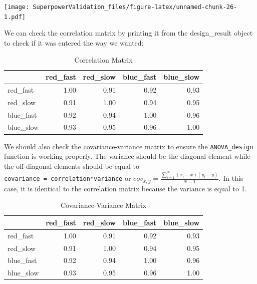 \documentclass[
]{book}
\newenvironment{Shaded}{\begin{snugshade}}{\end{snugshade}}
\newcommand{\NormalTok}[1]{#1}
\newcommand{\SpecialCharTok}[1]{\textcolor[rgb]{0.00,0.00,0.00}{#1}}
\begin{document}
\texttt{[image: SuperpowerValidation\_files/figure-latex/unnamed-chunk-26-1.pdf]}

\newpage

We can check the correlation matrix by printing it from the design\_result object to check if it was entered the way we wanted:

\begin{Shaded}
\end{Shaded}

\begin{table}[!h]

\caption{\label{tab:unnamed-chunk-28}Correlation Matrix}
\centering
\begin{tabular}[t]{l|r|r|r|r}
\hline
  & red\_fast & red\_slow & blue\_fast & blue\_slow\\
\hline
red\_fast & 1.00 & 0.91 & 0.92 & 0.93\\
\hline
red\_slow & 0.91 & 1.00 & 0.94 & 0.95\\
\hline
blue\_fast & 0.92 & 0.94 & 1.00 & 0.96\\
\hline
blue\_slow & 0.93 & 0.95 & 0.96 & 1.00\\
\hline
\end{tabular}
\end{table}

We should also check the covariance-variance matrix to ensure the \texttt{ANOVA\_design} function is working properly.
The variance should be the diagonal element while the off-diagonal elements should be equal to \texttt{covariance\ =\ correlation*variance} or \(cov_{x,y}=\frac{\sum_{i=1}^{N}(x_{i}-\bar{x})(y_{i}-\bar{y})}{N-1}\).
In this case, it is identical to the correlation matrix because the variance is equal to 1.

\begin{Shaded}
\end{Shaded}

\begin{table}[!h]

\caption{\label{tab:unnamed-chunk-30}Covariance-Variance Matrix}
\centering
\begin{tabular}[t]{l|r|r|r|r}
\hline
  & red\_fast & red\_slow & blue\_fast & blue\_slow\\
\hline
red\_fast & 1.00 & 0.91 & 0.92 & 0.93\\
\hline
red\_slow & 0.91 & 1.00 & 0.94 & 0.95\\
\hline
blue\_fast & 0.92 & 0.94 & 1.00 & 0.96\\
\hline
blue\_slow & 0.93 & 0.95 & 0.96 & 1.00\\
\hline
\end{tabular}
\end{table}
\end{document}

